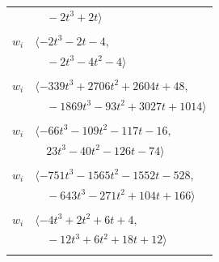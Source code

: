\documentclass[11pt]{article}
\begin{document}
\begin{longtable}{@{}ll@{}}
 & $\quad -2t^{3}+2t\rangle$\\
\addlinespace[2pt]
\multicolumn{2}{@{}p{0.97\textwidth}@{}}{$i=23$, $D_i=2$, $\rho_{ij}$: $0{:}1, \allowbreak 9{:}2, \allowbreak 19{:}1, \allowbreak 21{:}2, \allowbreak 25{:}1, \allowbreak 35{:}2$}\\
$w_i$ & $\langle -2t^{3}-2t-4,$\\
 & $\quad -2t^{3}-4t^{2}-4\rangle$\\
\addlinespace[2pt]
\multicolumn{2}{@{}p{0.97\textwidth}@{}}{$i=24$, $D_i=16$, $\rho_{ij}$: $4{:}2, \allowbreak 7{:}1, \allowbreak 9{:}1, \allowbreak 11{:}2, \allowbreak 15{:}2, \allowbreak 18{:}1, \allowbreak 22{:}2, \allowbreak 29{:}2, \allowbreak 36{:}2, \allowbreak 38{:}2$}\\
$w_i$ & $\langle -339t^{3}+2706t^{2}+2604t+48,$\\
 & $\quad -1869t^{3}-93t^{2}+3027t+1014\rangle$\\
\addlinespace[2pt]
\multicolumn{2}{@{}p{0.97\textwidth}@{}}{$i=25$, $D_i=8$, $\rho_{ij}$: $4{:}2, \allowbreak 10{:}1, \allowbreak 13{:}2, \allowbreak 20{:}1, \allowbreak 23{:}2, \allowbreak 26{:}2, \allowbreak 31{:}2, \allowbreak 32{:}1$}\\
$w_i$ & $\langle -66t^{3}-109t^{2}-117t-16,$\\
 & $\quad 23t^{3}-40t^{2}-126t-74\rangle$\\
\addlinespace[2pt]
\multicolumn{2}{@{}p{0.97\textwidth}@{}}{$i=26$, $D_i=32$, $\rho_{ij}$: $6{:}1, \allowbreak 8{:}1, \allowbreak 10{:}1, \allowbreak 11{:}2, \allowbreak 19{:}1, \allowbreak 20{:}1, \allowbreak 25{:}1, \allowbreak 32{:}2, \allowbreak 37{:}1, \allowbreak 39{:}2, \allowbreak 40{:}2, \allowbreak 41{:}2$}\\
$w_i$ & $\langle -751t^{3}-1565t^{2}-1552t-528,$\\
 & $\quad -643t^{3}-271t^{2}+104t+166\rangle$\\
\addlinespace[2pt]
\multicolumn{2}{@{}p{0.97\textwidth}@{}}{$i=27$, $D_i=2$, $\rho_{ij}$: $1{:}1, \allowbreak 5{:}2, \allowbreak 28{:}2, \allowbreak 36{:}2$}\\
$w_i$ & $\langle -4t^{3}+2t^{2}+6t+4,$\\
 & $\quad -12t^{3}+6t^{2}+18t+12\rangle$\\
\addlinespace[2pt]
\multicolumn{2}{@{}p{0.97\textwidth}@{}}{$i=28$, $D_i=8$, $\rho_{ij}$: $2{:}2, \allowbreak 3{:}1, \allowbreak 4{:}2, \allowbreak 5{:}1, \allowbreak 7{:}1, \allowbreak 10{:}2, \allowbreak 17{:}1, \allowbreak 18{:}1, \allowbreak 19{:}1, \allowbreak 27{:}1, \allowbreak 30{:}1, \allowbreak 36{:}2$}\\

\end{longtable}
\end{document}
